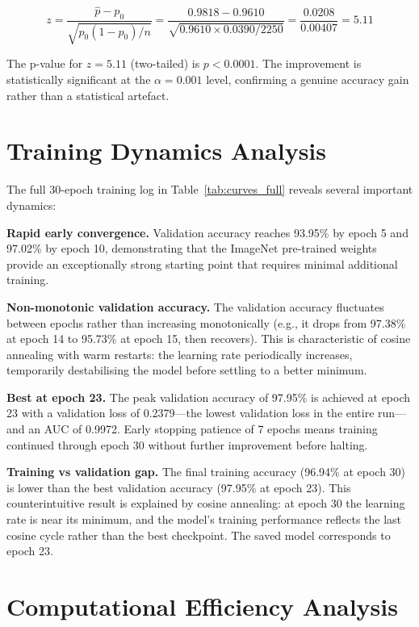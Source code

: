 \documentclass[12pt,a4paper,oneside]{report}
\begin{document}
\[
z = \frac{\hat{p} - p_0}{\sqrt{p_0(1-p_0)/n}}
= \frac{0.9818 - 0.9610}{\sqrt{0.9610 \times 0.0390 / 2250}}
= \frac{0.0208}{0.00407} = 5.11
\]

The p-value for $z = 5.11$ (two-tailed) is $p < 0.0001$. The improvement is
statistically significant at the $\alpha = 0.001$ level, confirming a genuine
accuracy gain rather than a statistical artefact.

\section{Training Dynamics Analysis}
\label{sec:training_dynamics}

The full 30-epoch training log in Table~\ref{tab:curves_full} reveals several
important dynamics:

\textbf{Rapid early convergence.} Validation accuracy reaches 93.95\% by epoch 5
and 97.02\% by epoch 10, demonstrating that the ImageNet pre-trained weights provide
an exceptionally strong starting point that requires minimal additional training.

\textbf{Non-monotonic validation accuracy.} The validation accuracy fluctuates
between epochs rather than increasing monotonically (e.g., it drops from 97.38\%
at epoch 14 to 95.73\% at epoch 15, then recovers). This is characteristic of
cosine annealing with warm restarts: the learning rate periodically increases,
temporarily destabilising the model before settling to a better minimum.

\textbf{Best at epoch 23.} The peak validation accuracy of 97.95\% is achieved
at epoch 23 with a validation loss of 0.2379---the lowest validation loss in the
entire run---and an AUC of 0.9972. Early stopping patience of 7 epochs means
training continued through epoch 30 without further improvement before halting.

\textbf{Training vs validation gap.} The final training accuracy (96.94\% at epoch 30)
is lower than the best validation accuracy (97.95\% at epoch 23). This counterintuitive
result is explained by cosine annealing: at epoch 30 the learning rate is near its
minimum, and the model's training performance reflects the last cosine cycle
rather than the best checkpoint. The saved model corresponds to epoch 23.

\section{Computational Efficiency Analysis}
\label{sec:efficiency}
\end{document}
